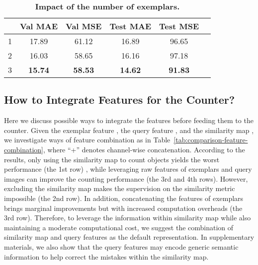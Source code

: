 \documentclass[10pt,twocolumn,letterpaper]{article}
\begin{document}
\begin{table}
  \centering
  \renewcommand{\arraystretch}{1.2}
  \addtolength{\tabcolsep}{2.5pt}
    \begin{tabular}{@{}lccccc@{}}
    \toprule
     & Val MAE & Val MSE & Test MAE & Test MSE \\ 
    \midrule
    1   & 17.89   & 61.12   & 16.89    &  96.65   \\
    2   & 16.03   & 58.65   & 16.16    &  97.18    \\
    3   & \textbf{15.74}    & \textbf{58.53} & \textbf{14.62} & \textbf{91.83} \\
    \bottomrule
    \end{tabular}
    \vspace{-10pt}
    \caption{\textbf{Impact of the number of exemplars.}}
    \label{tab:different-exemplar-number}
\end{table}

\subsection{How to Integrate Features for the Counter?}
\label{sec:feature-combination}
Here we discuss possible ways to integrate the features before feeding them to the counter. Given the exemplar feature , the query feature , and the similarity map , we investigate  ways of feature combination as in Table~\ref{tab:comparison-feature-combination}, where ``+'' denotes channel-wise concatenation. According to the results, only using the similarity map to count objects yields the worst performance (the 1st row) , while leveraging raw features of exemplars and query images can improve the counting performance (the 3rd and 4th rows). However, excluding the similarity map makes the supervision on the similarity metric impossible (the 2nd row). In addition, concatenating the features of exemplars brings marginal improvements but with increased computation overheads (the 3rd row). Therefore, to leverage the information within similarity map while also maintaining a moderate computational cost, we suggest the combination of similarity map and query features as the default representation. 
In supplementary materials, we also show that the query features may encode generic semantic information to help correct the mistakes within the similarity map.
\end{document}
